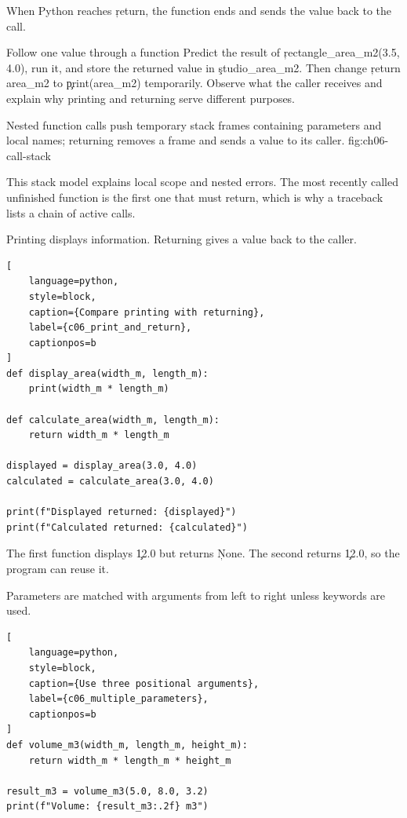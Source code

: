 When Python reaches \c{return}, the function ends and sends the value back to
the call.

\begin{TryBox}{Follow one value through a function}
Predict the result of \c{rectangle_area_m2(3.5, 4.0)}, run it, and store the
returned value in \c{studio_area_m2}. Then change \c{return area_m2} to
\c{print(area_m2)} temporarily. Observe what the caller receives and explain
why printing and returning serve different purposes.
\end{TryBox}

{Nested function calls push temporary stack frames containing parameters and local names; returning removes a frame and sends a value to its caller.}
{fig:ch06-call-stack}

This stack model explains local scope and nested errors. The most recently
called unfinished function is the first one that must return, which is why a
traceback lists a chain of active calls.


Printing displays information. Returning gives a value back to the caller.

\begin{lstlisting}[
    language=python,
    style=block,
    caption={Compare printing with returning},
    label={c06_print_and_return},
    captionpos=b
]
def display_area(width_m, length_m):
    print(width_m * length_m)

def calculate_area(width_m, length_m):
    return width_m * length_m

displayed = display_area(3.0, 4.0)
calculated = calculate_area(3.0, 4.0)

print(f"Displayed returned: {displayed}")
print(f"Calculated returned: {calculated}")
\end{lstlisting}

The first function displays \c{12.0} but returns \c{None}. The second returns
\c{12.0}, so the program can reuse it.


Parameters are matched with arguments from left to right unless keywords are
used.

\begin{lstlisting}[
    language=python,
    style=block,
    caption={Use three positional arguments},
    label={c06_multiple_parameters},
    captionpos=b
]
def volume_m3(width_m, length_m, height_m):
    return width_m * length_m * height_m

result_m3 = volume_m3(5.0, 8.0, 3.2)
print(f"Volume: {result_m3:.2f} m3")
\end{lstlisting}

